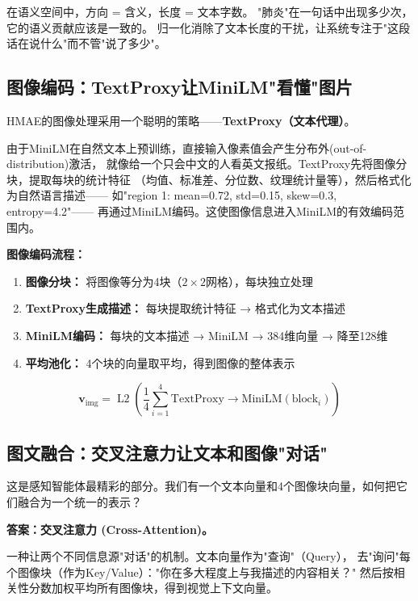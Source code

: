 \documentclass[11pt,a4paper]{ctexart}
\DeclareMathOperator{\Ltwo}{L2}
\begin{document}
\begin{keybox}[为什么只保留方向？]
在语义空间中，方向 = 含义，长度 = 文本字数。
"肺炎"在一句话中出现多少次，它的语义贡献应该是一致的。
归一化消除了文本长度的干扰，让系统专注于"这段话在说什么"而不管"说了多少"。
\end{keybox}

\subsection{图像编码：TextProxy让MiniLM"看懂"图片}

HMAE的图像处理采用一个聪明的策略——\textbf{TextProxy（文本代理）}。

\begin{defbox}
由于MiniLM在自然文本上预训练，直接输入像素值会产生分布外(out-of-distribution)激活，
就像给一个只会中文的人看英文报纸。TextProxy先将图像分块，提取每块的统计特征
（均值、标准差、分位数、纹理统计量等），然后格式化为自然语言描述——
如"region 1: mean=0.72, std=0.15, skew=0.3, entropy=4.2"——
再通过MiniLM编码。这使图像信息进入MiniLM的有效编码范围内。
\end{defbox}

\textbf{图像编码流程：}
\begin{enumerate}[nosep]
\item \textbf{图像分块：} 将图像等分为4块（$2 \times 2$网格），每块独立处理
\item \textbf{TextProxy生成描述：} 每块提取统计特征 → 格式化为文本描述
\item \textbf{MiniLM编码：} 每块的文本描述 → MiniLM → 384维向量 → 降至128维
\item \textbf{平均池化：} 4个块的向量取平均，得到图像的整体表示
\end{enumerate}

$$\mathbf{v}_{\text{img}} = \Ltwo\left(\frac{1}{4}\sum_{i=1}^{4} \text{TextProxy} \to \text{MiniLM}(\text{block}_i)\right)$$

\subsection{图文融合：交叉注意力让文本和图像"对话"}

这是感知智能体最精彩的部分。我们有一个文本向量和4个图像块向量，如何把它们融合为一个统一的表示？

\textbf{答案：交叉注意力 (Cross-Attention)。}

\begin{defbox}[交叉注意力]
一种让两个不同信息源"对话"的机制。文本向量作为"查询"（Query），
去"询问"每个图像块（作为Key/Value）："你在多大程度上与我描述的内容相关？"
然后按相关性分数加权平均所有图像块，得到视觉上下文向量。
\end{defbox}
\end{document}

